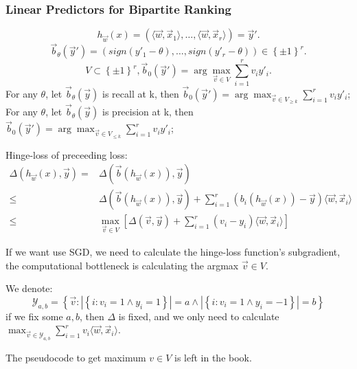 \subsubsection{Linear Predictors for Bipartite Ranking}%

\[
    h_{\vec{w}}(x) = (\langle \vec{w}, \vec{x}_1 \rangle, \ldots, \langle \vec{w}, \vec{x}_r \rangle) = \vec{y}'.
\]
\[
    \vec{b}_{\theta}(\vec{y}') = \left( sign(y'_1 - \theta), \ldots, sign(y'_r - \theta) \right) \in {\left\{ \pm 1 \right\}}^r.
\]
\[
    V \subset {\left\{ \pm 1 \right\}}^r, \vec{b}_0(\vec{y}') = \arg\max_{\vec{v} \in V} \sum^{r}_{i=1} v_i y'_i.
\]
For any $ \theta $, let $ \vec{b}_{\theta}(\vec{y}) $ is recall at k, then $ \vec{b}_0(\vec{y}') = \arg\max_{\vec{v} \in V_{\ge k}} \sum^{r}_{i=1} v_i y'_i $;
For any $ \theta $, let $ \vec{b}_{\theta}(\vec{y}) $ is precision at k, then $ \vec{b}_0(\vec{y}') = \arg\max_{\vec{v} \in V_{\le k}} \sum^{r}_{i=1} v_i y'_i $;

Hinge-loss of preceeding loss:
\begin{align*}
    \Delta(h_{\vec{w}}(x), \vec{y}) =& \Delta(\vec{b}(h_{\vec{w}}(x)), \vec{y})\\
    \le& \Delta(\vec{b}(h_{\vec{w}} (x)), \vec{y}) + \sum^{r}_{i=1} (b_i(h_{\vec{w}}(x)) - \vec{y})\langle \vec{w}, \vec{x}_i \rangle\\
    \le& \max_{\vec{v} \in V} \left[ \Delta(\vec{v}, \vec{y}) + \sum^{r}_{i=1} (v_i - y_i) \langle \vec{w}, \vec{x}_i \rangle \right]
\end{align*}

If we want use SGD, we need to calculate the hinge-loss function's subgradient, the computational bottleneck is calculating the argmax $ \vec{v} \in V $.

We denote:
\[
    \mathcal{Y}_{a,b} = \left\{ \vec{v}: \left| \left\{ i: v_i = 1 \wedge y_i = 1 \right\} \right| = a \wedge \left| \left\{ i: v_i = 1 \wedge y_i = -1 \right\} \right| = b \right\}
\]
if we fix some $ a, b $, then $ \Delta $ is fixed, and we only need to calculate $ \max_{\vec{v} \in \mathcal{Y}_{a,b}} \sum^{r}_{i=1} v_i \langle \vec{w}, \vec{x}_i \rangle $.

The pseudocode to get maximum $ v \in V $ is left in the book.



